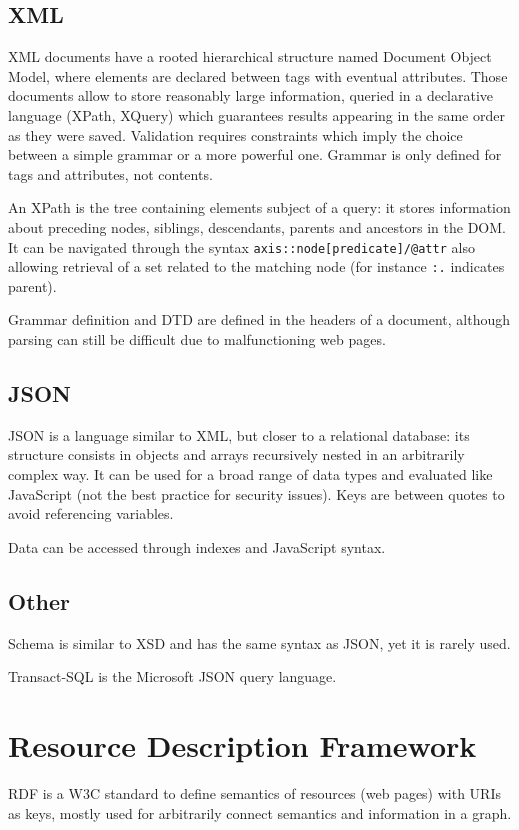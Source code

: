 \subsection{XML}
XML documents have a rooted hierarchical structure named Document Object Model, where elements are declared between tags with eventual attributes. Those documents allow to store reasonably large information, queried in a declarative language (XPath, XQuery) which guarantees results appearing in the same order as they were saved. Validation requires constraints which imply the choice between a simple grammar or a more powerful one. Grammar is only defined for tags and attributes, not contents. 

An XPath is the tree containing elements subject of a query: it stores information about preceding nodes, siblings, descendants, parents and ancestors in the DOM. It can be navigated through the syntax \texttt{axis::node[predicate]/@attr} also allowing retrieval of a set related to the matching node (for instance \texttt{:.} indicates parent). 

Grammar definition and DTD are defined in the headers of a document, although parsing can still be difficult due to malfunctioning web pages. 

\subsection{JSON}
JSON is a language similar to XML, but closer to a relational database: its structure consists in objects and arrays recursively nested in an arbitrarily complex way. It can be used for a broad range of data types and evaluated like JavaScript (not the best practice for security issues). Keys are between quotes to avoid referencing variables. 

Data can be accessed through indexes and JavaScript syntax.

\subsection{Other}
Schema is similar to XSD and has the same syntax as JSON, yet it is rarely used.

Transact-SQL is the Microsoft JSON query language.

\section{Resource Description Framework}
RDF is a W3C standard to define semantics of resources (web pages) with URIs as keys, mostly used for arbitrarily connect semantics and information in a graph. 

